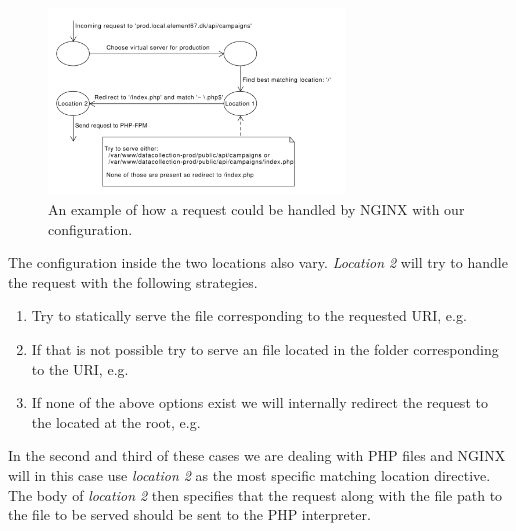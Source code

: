 \\
\begin{figure}[!htbp]
    \centering
    \includegraphics[width=0.7\textwidth]{graphic/architecture/NGINX_workflow.pdf}
    \caption{An example of how a request could be handled by NGINX with our configuration.}
    \label{fig:NGINX_workflow}
\end{figure}
\FloatBarrier

The configuration inside the two locations also vary. \emph{Location 2} will try to handle the request with the following strategies. 
\begin{enumerate}
    \setlength\itemsep{-0.2em}

	\item Try to statically serve the file corresponding to the requested URI, e.g.
	\\
	
    \item If that is not possible try to serve an  file located in the folder corresponding to the URI, e.g.
    \\

	\item If none of the above options exist we will internally redirect the request to the  located at the root, e.g.
	\\
\end{enumerate}

In the second and third of these cases we are dealing with PHP files and NGINX will in this case use \emph{location 2} as the most specific matching location directive. The body of \emph{location 2} then specifies that the request along with the file path to the file to be served should be sent to the PHP interpreter. 

